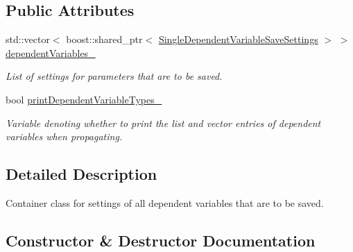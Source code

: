 \subsection*{Public Attributes}
\begin{DoxyCompactItemize}
\item 
std\+::vector$<$ boost\+::shared\+\_\+ptr$<$ \hyperlink{classtudat_1_1propagators_1_1SingleDependentVariableSaveSettings}{Single\+Dependent\+Variable\+Save\+Settings} $>$ $>$ \hyperlink{classtudat_1_1propagators_1_1DependentVariableSaveSettings_aa0e07e0f74ab14d556a56f5a51ff87cc}{dependent\+Variables\+\_\+}\hypertarget{classtudat_1_1propagators_1_1DependentVariableSaveSettings_aa0e07e0f74ab14d556a56f5a51ff87cc}{}\label{classtudat_1_1propagators_1_1DependentVariableSaveSettings_aa0e07e0f74ab14d556a56f5a51ff87cc}

\begin{DoxyCompactList}\small\item\em List of settings for parameters that are to be saved. \end{DoxyCompactList}\item 
bool \hyperlink{classtudat_1_1propagators_1_1DependentVariableSaveSettings_a85c76bfe9a5934dec1a2e814133073da}{print\+Dependent\+Variable\+Types\+\_\+}\hypertarget{classtudat_1_1propagators_1_1DependentVariableSaveSettings_a85c76bfe9a5934dec1a2e814133073da}{}\label{classtudat_1_1propagators_1_1DependentVariableSaveSettings_a85c76bfe9a5934dec1a2e814133073da}

\begin{DoxyCompactList}\small\item\em Variable denoting whether to print the list and vector entries of dependent variables when propagating. \end{DoxyCompactList}\end{DoxyCompactItemize}


\subsection{Detailed Description}
Container class for settings of all dependent variables that are to be saved. 

\subsection{Constructor \& Destructor Documentation}
